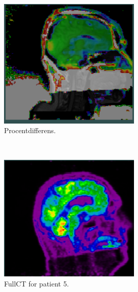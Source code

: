 \begin{figure}[H]
\begin{subfigure}{0.3\textwidth}
        \centering
        \includegraphics[width=0.75\textwidth]{colager/loocv_pet/loocv_010960_pet_pd.png}
        \caption{Procentdifferens.}
        \label{col:loocv_pet_pat4_pd}
    \end{subfigure}\\
    \begin{subfigure}{0.3\textwidth}
        \centering
        \includegraphics[width=0.75\textwidth]{colager/loocv_pet/loocv_011030_pet_ct.png}
        \caption{FullCT for patient 5.}
        \label{col:loocv_pet_pat5_ct}
    \end{subfigure}\hfill
    \begin{subfigure}{0.3\textwidth}
        \centering

\end{subfigure}
\end{figure}
